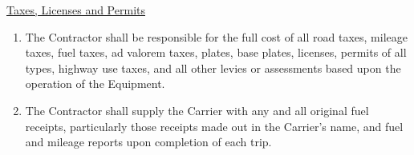 \underline{Taxes, Licenses and Permits}
\begin{enumerate}
    \item The Contractor shall be responsible for the full cost of all road
    taxes, mileage taxes, fuel taxes, ad valorem taxes, plates, base
    plates, licenses, permits of all types, highway use taxes, and all
    other levies or assessments based upon the operation of the Equipment.

    \item The Contractor shall supply the Carrier with any and all original
    fuel receipts, particularly those receipts made out in the Carrier's
    name, and fuel and mileage reports upon completion of each trip.
\end{enumerate}